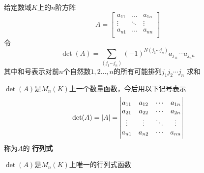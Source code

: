 \documentclass[11pt]{article}
\begin{document}
\begin{definition}[]
给定数域\(K\)上的\(n\)阶方阵
\begin{equation*}
A=
\begin{bmatrix}
a_{11}&\dots&a_{1n}\\
\vdots&\ddots&\vdots\\
a_{n1}&\dots&a_{nn}\\
\end{bmatrix}
\end{equation*}
令
\begin{equation*}
\det(A)=\sum_{(j_1\cdots j_n)}(-1)^{N(j_1\cdots j_n)}a_{j_11}\cdots a_{j_nn}
\end{equation*}
其中和号表示对前\(n\)个自然数\(1,2\dots,n\)的所有可能排列\(j_1j_2\cdots j_n\)
求和
\end{definition}

\(\det(A)\)是\(M_n(K)\)上一个数量函数，今后用以下记号表示
\begin{equation*}
\det(A)=\abs{A}=
\begin{vmatrix}
a_{11}&a_{12}&\cdots&a_{1n}\\
a_{21}&a_{22}&\cdots&a_{2n}\\
\vdots&\vdots&\ddots&\vdots\\
a_{n1}&a_{n2}&\cdots&a_{nn}
\end{vmatrix}
\end{equation*}
称为\(A\)的 \textbf{行列式}

\begin{theorem}[]
\(\det(A)\)是\(M_n(K)\)上唯一的行列式函数
\end{theorem}
\end{document}

